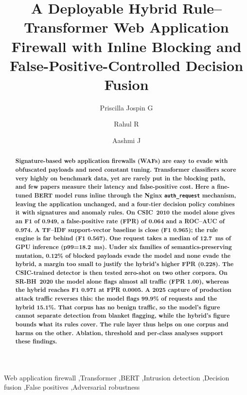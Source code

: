 \documentclass[preprint,11pt]{elsarticle}
\begin{document}
\begin{frontmatter}

\title{A Deployable Hybrid Rule--Transformer Web Application Firewall with
Inline Blocking and False-Positive-Controlled Decision Fusion}

\author[kits]{Priscilla Jospin G}
\author[kits]{Rahul R}
\author[kits]{Aashmi J}
\address[kits]{Division of Data Science and Cyber Security, School of Computer Science and Technology, Karunya Institute of Technology and Sciences, Karunya Nagar, Coimbatore, Tamil Nadu 641114, India}

\begin{abstract}
\bfseries
Signature-based web application firewalls (WAFs) are easy to evade with
obfuscated payloads and need constant tuning. Transformer classifiers score
very highly on benchmark data, yet are rarely put in the blocking path, and
few papers measure their latency and false-positive cost. Here a fine-tuned
BERT model runs inline through the Nginx \texttt{auth\_request} mechanism,
leaving the application unchanged, and a four-tier decision policy combines
it with signatures and anomaly rules. On CSIC~2010 the model alone gives an
F1 of 0.949, a false-positive rate (FPR) of 0.064 and a ROC--AUC of 0.974. A
TF--IDF support-vector baseline is close (F1 0.965); the rule engine is far
behind (F1 0.567). One request takes a median of 12.7~ms of GPU inference
(p99=18.2~ms). Under six families of semantics-preserving mutation, 0.12\%
of blocked payloads evade the model and none evade the hybrid, a margin too
small to justify the hybrid's higher FPR (0.228). The CSIC-trained detector
is then tested zero-shot on two other corpora. On SR-BH~2020 the model
alone flags almost all traffic (FPR 1.00), whereas the hybrid reaches F1
0.971 at FPR 0.0005. A 2025 capture of production attack traffic reverses
this: the model flags 99.9\% of requests and the hybrid 15.1\%. That corpus
has no benign traffic, so the model's figure cannot separate detection from
blanket flagging, while the hybrid's figure bounds what its rules cover.
The rule layer thus helps on one corpus and harms on the other. Ablation,
threshold and per-class analyses support these findings.
\end{abstract}

\begin{keyword}
Web application firewall \sep Transformer \sep BERT \sep Intrusion detection \sep Decision fusion \sep False positives \sep Adversarial robustness
\end{keyword}

\end{frontmatter}
\end{document}
